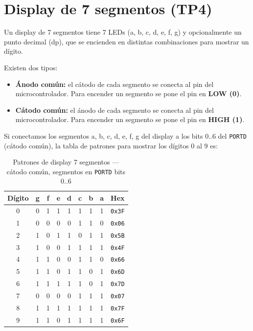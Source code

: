 \section{Display de 7 segmentos (TP4)}

Un display de 7 segmentos tiene 7 LEDs (a, b, c, d, e, f, g) y opcionalmente un
punto decimal (dp), que se encienden en distintas combinaciones para mostrar un
dígito.


Existen dos tipos:
\begin{itemize}
    \item \textbf{Ánodo común:} el cátodo de cada segmento se conecta al pin del
          microcontrolador. Para encender un segmento se pone el pin en \textbf{LOW (0)}.
    \item \textbf{Cátodo común:} el ánodo de cada segmento se conecta al pin del
          microcontrolador. Para encender un segmento se pone el pin en \textbf{HIGH (1)}.
\end{itemize}

Si conectamos los segmentos a, b, c, d, e, f, g del display a los bits 0..6 del
\texttt{PORTD} (cátodo común), la tabla de patrones para mostrar los dígitos 0 al 9 es:

\begin{table}[H]
\centering
\begin{tabular}{ccccccccc}
\toprule
\textbf{Dígito} & \textbf{g} & \textbf{f} & \textbf{e} & \textbf{d} &
\textbf{c} & \textbf{b} & \textbf{a} & \textbf{Hex} \\
\midrule
0 & 0 & 1 & 1 & 1 & 1 & 1 & 1 & \texttt{0x3F} \\
1 & 0 & 0 & 0 & 0 & 1 & 1 & 0 & \texttt{0x06} \\
2 & 1 & 0 & 1 & 1 & 0 & 1 & 1 & \texttt{0x5B} \\
3 & 1 & 0 & 0 & 1 & 1 & 1 & 1 & \texttt{0x4F} \\
4 & 1 & 1 & 0 & 0 & 1 & 1 & 0 & \texttt{0x66} \\
5 & 1 & 1 & 0 & 1 & 1 & 0 & 1 & \texttt{0x6D} \\
6 & 1 & 1 & 1 & 1 & 1 & 0 & 1 & \texttt{0x7D} \\
7 & 0 & 0 & 0 & 0 & 1 & 1 & 1 & \texttt{0x07} \\
8 & 1 & 1 & 1 & 1 & 1 & 1 & 1 & \texttt{0x7F} \\
9 & 1 & 1 & 0 & 1 & 1 & 1 & 1 & \texttt{0x6F} \\
\bottomrule
\end{tabular}
\caption{Patrones de display 7 segmentos --- cátodo común, segmentos en \texttt{PORTD} bits 0..6}
\end{table}

